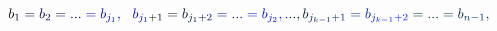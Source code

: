 \documentclass[12pt]{article}
\begin{document}
\makeatletter
\renewcommand*{\@textcolor}[3]{%
  \protect\leavevmode
  \begingroup
    \color#1{#2}#3%
  \endgroup
}
\makeatother
\begin{displaymath}
\mathcolor[RGB]{0,0,15}{b} _ { \mathcolor[RGB]{0,0,30}{1} } \mathcolor[RGB]{0,0,45}{=} \mathcolor[RGB]{0,0,60}{b} _ { \mathcolor[RGB]{0,0,75}{2} } \mathcolor[RGB]{0,0,90}{=} \mathcolor[RGB]{0,0,105}{.} \mathcolor[RGB]{0,0,120}{.} \mathcolor[RGB]{0,0,135}{.} \mathcolor[RGB]{0,0,150}{=} \mathcolor[RGB]{0,0,165}{b} _ { \mathcolor[RGB]{0,0,180}{j} _ { \mathcolor[RGB]{0,0,195}{1} } } \mathcolor[RGB]{0,0,210}{,} \ \ \mathcolor[RGB]{0,0,225}{b} _ { \mathcolor[RGB]{0,0,240}{j} _ { \mathcolor[RGB]{0,0,255}{1} } \mathcolor[RGB]{0,15,0}{+} \mathcolor[RGB]{0,15,15}{1} } \mathcolor[RGB]{0,15,30}{=} \mathcolor[RGB]{0,15,45}{b} _ { \mathcolor[RGB]{0,15,60}{j} _ { \mathcolor[RGB]{0,15,75}{1} } \mathcolor[RGB]{0,15,90}{+} \mathcolor[RGB]{0,15,105}{2} } \mathcolor[RGB]{0,15,120}{=} \mathcolor[RGB]{0,15,135}{.} \mathcolor[RGB]{0,15,150}{.} \mathcolor[RGB]{0,15,165}{.} \mathcolor[RGB]{0,15,180}{=} \mathcolor[RGB]{0,15,195}{b} _ { \mathcolor[RGB]{0,15,210}{j} _ { \mathcolor[RGB]{0,15,225}{2} } } \mathcolor[RGB]{0,15,240}{,} \mathcolor[RGB]{0,15,255}{.} \mathcolor[RGB]{0,30,0}{.} \mathcolor[RGB]{0,30,15}{.} \mathcolor[RGB]{0,30,30}{,} \mathcolor[RGB]{0,30,45}{b} _ { \mathcolor[RGB]{0,30,60}{j} _ { \mathcolor[RGB]{0,30,75}{k} \mathcolor[RGB]{0,30,90}{-} \mathcolor[RGB]{0,30,105}{1} } \mathcolor[RGB]{0,30,120}{+} \mathcolor[RGB]{0,30,135}{1} } \mathcolor[RGB]{0,30,150}{=} \mathcolor[RGB]{0,30,165}{b} _ { \mathcolor[RGB]{0,30,180}{j} _ { \mathcolor[RGB]{0,30,195}{k} \mathcolor[RGB]{0,30,210}{-} \mathcolor[RGB]{0,30,225}{1} } \mathcolor[RGB]{0,30,240}{+} \mathcolor[RGB]{0,30,255}{2} } \mathcolor[RGB]{0,45,0}{=} \mathcolor[RGB]{0,45,15}{.} \mathcolor[RGB]{0,45,30}{.} \mathcolor[RGB]{0,45,45}{.} \mathcolor[RGB]{0,45,60}{=} \mathcolor[RGB]{0,45,75}{b} _ { \mathcolor[RGB]{0,45,90}{n} \mathcolor[RGB]{0,45,105}{-} \mathcolor[RGB]{0,45,120}{1} } \mathcolor[RGB]{0,45,135}{,}
\end{displaymath}
\end{document}
